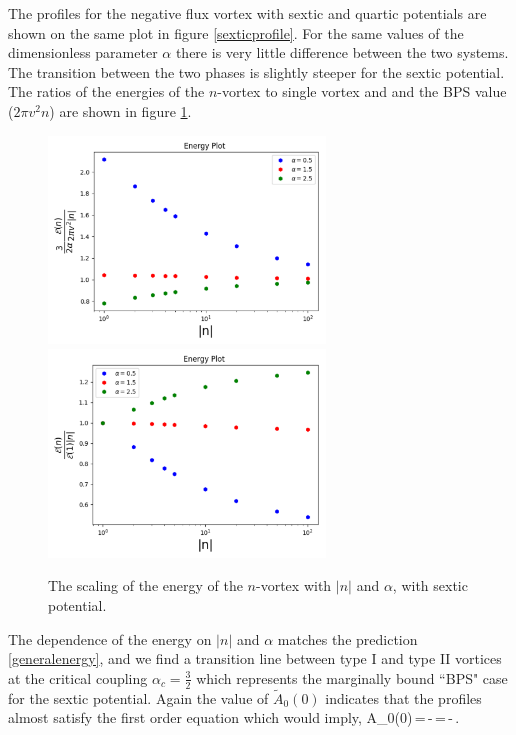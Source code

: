 The profiles for the negative flux vortex with sextic and quartic potentials are shown on the same plot in figure \ref{sexticprofile}. For the same values of the dimensionless parameter $\alpha$ there is very little difference between the two systems. The transition between the two phases is slightly steeper for the sextic potential. The ratios of the energies of the $n$-vortex to single vortex and and the BPS value ($2\pi v^2 n$) are shown in figure 
\ref{sexticenergy}.
 \begin{figure}[h]
\begin{center}
 \includegraphics[width=2.9in]{Chapter_2_Folder_1912.11321/figures/sixth_order_alpha.pdf}\hspace{0.1in}\includegraphics[width=2.9in]{Chapter_2_Folder_1912.11321/figures/sixth_order_alpha_byE1.pdf}
     \caption{{ \small The scaling of the energy of the $n$-vortex with $|n|$ and $\alpha$, with sextic potential.}} \label{sexticenergy}
    \end{center}
\end{figure}
The dependence of the energy on $|n|$ and $\alpha$ matches the prediction \eqref{generalenergy}, and we find a transition line between type I and type II vortices at the critical coupling $\alpha_c = \tfrac32$ which represents the marginally bound ``BPS" case for the sextic potential.   Again the value of $\tilde A_0(0)$ indicates that the profiles almost satisfy the first order equation which would imply,
\be
\tilde A_0(0)\,=\,-\,=\,-\,.
